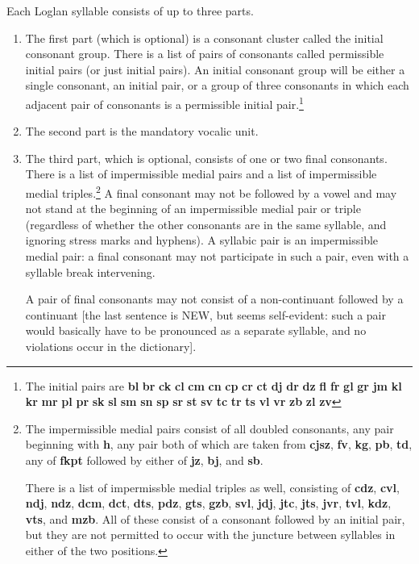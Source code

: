 \documentclass[12pt]{book}
\begin{document}
Each Loglan syllable consists of up to three parts.  
\begin{enumerate}

\item The first part (which is optional) is a consonant cluster called the initial consonant group.  There is a list of pairs of consonants  called permissible initial pairs (or just initial pairs).  An initial consonant group will be either a single consonant, an initial pair, or a group of three consonants in which each adjacent pair of consonants is a permissible initial pair.\footnote{The initial pairs are {\bf bl}  {\bf br}  {\bf ck}  {\bf cl}  {\bf cm}  {\bf cn}   {\bf cp}  {\bf cr}   {\bf ct}   {\bf dj}   {\bf dr}   {\bf dz}  {\bf fl}  {\bf fr}   {\bf gl}   {\bf gr}   {\bf jm}   {\bf kl}  {\bf kr}   {\bf mr}   {\bf pl}  {\bf pr}   {\bf sk}  {\bf sl}   {\bf sm}  {\bf sn}  {\bf sp}   {\bf sr}  {\bf st}  {\bf sv} {\bf tc}  {\bf tr}  {\bf ts}  {\bf vl}  {\bf vr} {\bf  zb}  {\bf  zl}  {\bf zv}}

\item The second part is the mandatory vocalic unit.

\item The third part, which is optional, consists of one or two final consonants.  There is a list of impermissible medial pairs and a list of impermissible medial triples.\footnote{The impermissible medial pairs consist of all doubled consonants, any pair beginning with {\bf h}, any pair both of which are taken from {\bf cjsz}, {\bf fv}, {\bf kg}, {\bf pb}, {\bf td},
any of {\bf fkpt} followed by either of {\bf jz}, {\bf bj}, and {\bf sb}.

There is a list of impermissble medial triples as well, consisting of {\bf cdz}, {\bf cvl}, {\bf ndj}, {\bf ndz}, {\bf dcm}, {\bf dct}, {\bf dts}, {\bf pdz}, {\bf gts}, {\bf gzb}, {\bf svl}, {\bf jdj}, {\bf jtc}, {\bf jts}, {\bf jvr}, {\bf tvl}, {\bf kdz}, {\bf vts}, and {\bf mzb}.  All of these consist of a consonant followed by an initial pair, but they are not permitted to occur with the juncture between syllables in either of the two positions.} A final consonant
may not be followed by a vowel and may not stand at the beginning of an impermissible medial pair or triple (regardless of whether the other consonants are in the same syllable, and ignoring stress marks and hyphens).  A syllabic pair is an impermissible medial pair:  a final consonant may not participate in such a pair, even with a syllable break intervening.

A pair of final consonants may not consist of a non-continuant followed by a continuant [the last sentence is NEW, but seems self-evident:  such a pair would basically have to be pronounced as a separate syllable, and no violations occur in the dictionary].


\end{enumerate}
\end{document}
